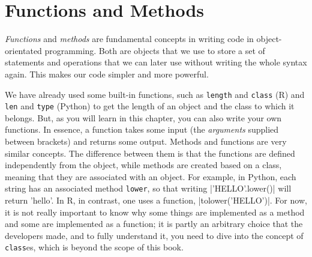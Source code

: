 

%

\section{Functions and Methods}
\label{sec:functions}

\emph{Functions} and \emph{methods} are fundamental concepts in
writing code in object-orientated programming. Both are objects that
we use to store a set of statements and operations that we can later
use without writing the whole syntax again. This makes our code
simpler and more powerful.

We have already used some built-in functions, such as \texttt{length} and
\texttt{class} (R) and \texttt{len} and \texttt{type} (Python) to get the length
of an object and the class to which it belongs. But, as you will learn
in this chapter, you can also write your own functions. In essence, a
function takes some input (the \emph{arguments} supplied between
brackets) and returns some output.  Methods and functions are very
similar concepts. The difference between them is that the functions
are defined independently from the object, while methods are created
based on a class, meaning that they are associated with an object. For
example, in Python, each string has an associated method \texttt{lower},
so that writing |'HELLO'.lower()| will return 'hello'. In R, in
contrast, one uses a function, |tolower('HELLO')|. For now, it is not
really important to know why some things are implemented as a method
and some are implemented as a function; it is partly an arbitrary
choice that the developers made, and to fully understand it, you need
to dive into the concept of \texttt{class}es, which is beyond the scope of
this book.




